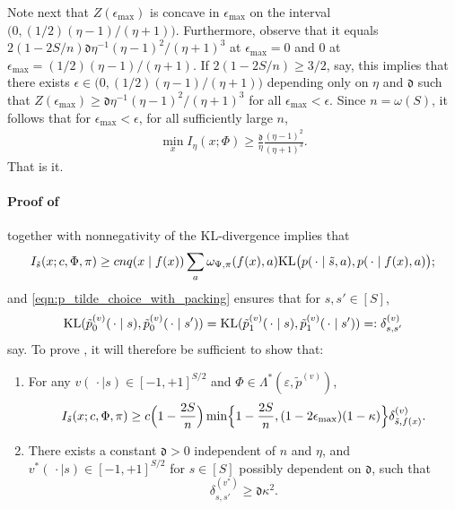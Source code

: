\documentclass[11pt]{article}
\newcommand{\mf}[1]{\mathfrak{#1}}
\newcommand{\KL}{\textnormal{KL}}
\theoremstyle{definition}
\theoremstyle{definition}
\begin{document}
Note next that $Z(\epsilon_{\max})$ is concave in $\epsilon_{\max}$ on the interval $\bigl( 0, (1/2)(\eta-1)/(\eta+1) \bigr)$.
Furthermore, observe that it equals $2(1-2S/n)\mf{d}\eta^{-1}(\eta-1)^2/(\eta+1)^3$ at $\epsilon_{\max}=0$ and $0$ at $\epsilon_{\max}=(1/2)(\eta-1)/(\eta+1)$.
If $2(1-2S/n)\geq 3/2$, say, this implies that there exists $\epsilon\in \bigl( 0, (1/2)(\eta-1)/(\eta+1) \bigr)$ depending only on $\eta$ and $\mf{d}$ such that $Z(\epsilon_{\max})\geq \mf{d}\eta^{-1}(\eta-1)^2/(\eta+1)^3$ for all $\epsilon_{\max}<\epsilon$.
Since $n=\omega(S)$, it follows that for $\epsilon_{\max}<\epsilon$, for all sufficiently large $n$,
\begin{align}
	\min_{x }
	I_{\eta}(x;\Phi)
	\geq
	\frac{\mf{d}}{\eta}
	\frac{(\eta-1)^2}{(\eta+1)^3}
	.
\end{align}
That is it.

\paragraph{Proof of \texorpdfstring{}{identifiability}}

 together with nonnegativity of the KL-divergence implies that
\begin{equation}
	I_{\tilde{s}}(x;c,\Phi,\pi)
	\geq
	cnq(x\mid f(x))
	\sum_a
	\omega_{\Psi,\pi}(f(x),a)
	\KL\bigl( p(\,\cdot\mid \tilde{s},a),p(\,\cdot\mid f(x),a) \bigr)
	;
	\label{eqn:I_lower_bound_in_terms_of_KL_p}
\end{equation}
and \eqref{eqn:p_tilde_choice_with_packing} ensures that for $s, s' \in [S]$,
\begin{equation}
	\KL(\tilde{p}^{(v)}_0(\,\cdot\mid  s),\tilde{p}^{(v)}_0(\,\cdot\mid  s'))
	=
	\KL(\tilde{p}^{(v)}_1(\,\cdot\mid  s),\tilde{p}^{(v)}_1(\,\cdot\mid  s'))
	=:
	\delta^{(v)}_{s,s'}
\end{equation}
say.
To prove , it will therefore be sufficient to show that:
\begin{enumerate}[label=(\alph*)]
	\item
	      For any $v(\,\cdot\mid  s)\in [-1,+1]^{S/2}$ and $\Phi\in\Lambda^*(\varepsilon,\tilde{p}^{(v)})$,
	      \begin{equation}
		      I_{\tilde{s}}(x;c,\Phi,\pi)
		      \geq
		      c
			  \Bigl(1-\frac{2S}{n}\Bigr)
			  \min\Bigl\{
				1-\frac{2S}{n},(1-2\epsilon_{\max})(1-\kappa)
			  \Bigr\}
		      \delta^{(v)}_{\tilde{s},f(x)}
		      .
		      \label{eqn:I_lower_bound_in_terms_of_KL_ptilde}
	      \end{equation}

	\item
	      There exists a constant $\mf{d}>0$ independent of $n$ and $\eta$, and $v^*( \,\cdot\mid  s )\in[-1,+1]^{S/2}$ for $s\in[S]$ possibly dependent on $\mf{d}$, such that
	      \begin{equation}
		      \label{eqn:bound_on_KL_div}
		      \delta^{(v^*)}_{s,s'}
		      \geq
		      \mf{d}\kappa^2
		      .
	      \end{equation}
\end{enumerate}
\end{document}
